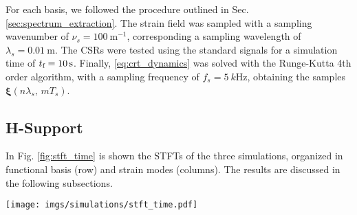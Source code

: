 For each basis, we followed the procedure outlined in Sec. \ref{sec:spectrum_extraction}.
The strain field was sampled with a sampling wavenumber of $\nu_s = \SI{100}{\meter^{-1}}$, corresponding a sampling wavelength of $\lambda_s = \SI{0.01}{\meter}$. The \acp{CSR} were tested using the standard signals for a simulation time of $t_{\textnormal{f}} = \SI{10}{\second}$. Finally, \eqref{eq:crt_dynamics} was solved with the Runge-Kutta 4th order algorithm, with a sampling frequency of $f_s = \SI{5}{k \hertz}$, obtaining the samples $\bm{\xi}(n \lambda_s, \, m T_s)$.

\subsection{H-Support} \label{numerical_validation:hsupport}
    In Fig. \ref{fig:stft_time} is shown the \acp{STFT} of the three simulations, organized in functional basis (row) and strain modes (columns). The results are discussed in the following subsections.
    \begin{figure*}
        \centering
        \texttt{[image: imgs/simulations/stft\_time.pdf]}
        \caption{The space-time spectra of the H-Support numerical example discussed in Sec. \ref{numerical_validation:hsupport}. The \acp{STFT} are organized in functional basis (rows) and strain modes (columns). The \acp{STFT} show the time-frequency response varying the components of the spatial spectrum. The values are normalized to $|\Xi_i(j0, j0)|$.}
        \label{fig:stft_time}
    \end{figure*}
